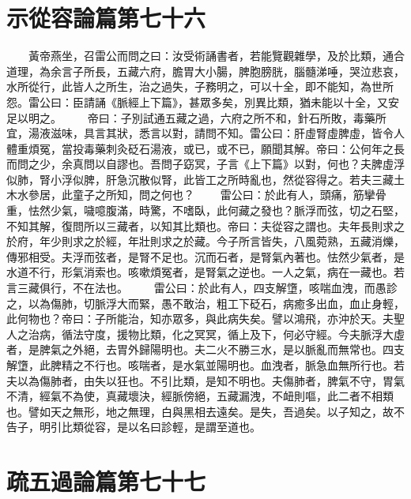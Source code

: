 \section{示從容論篇第七十六}

　　黃帝燕坐，召雷公而問之曰：汝受術誦書者，若能覽觀雜學，及於比類，通合道理，為余言子所長，五藏六府，膽胃大小腸，脾胞膀胱，腦髓涕唾，哭泣悲哀，水所從行，此皆人之所生，治之過失，子務明之，可以十全，即不能知，為世所怨。雷公曰：臣請誦《脈經上下篇》，甚眾多矣，別異比類，猶未能以十全，又安足以明之。
　　帝曰：子別試通五藏之過，六府之所不和，針石所敗，毒藥所宜，湯液滋味，具言其狀，悉言以對，請問不知。雷公曰：肝虛腎虛脾虛，皆令人體重煩冤，當投毒藥刺灸砭石湯液，或已，或不已，願聞其解。帝曰：公何年之長而問之少，余真問以自謬也。吾問子窈冥，子言《上下篇》以對，何也？夫脾虛浮似肺，腎小浮似脾，肝急沉散似腎，此皆工之所時亂也，然從容得之。若夫三藏土木水參居，此童子之所知，問之何也？
　　雷公曰：於此有人，頭痛，筋攣骨重，怯然少氣，噦噫腹滿，時驚，不嗜臥，此何藏之發也？脈浮而弦，切之石堅，不知其解，復問所以三藏者，以知其比類也。帝曰：夫從容之謂也。夫年長則求之於府，年少則求之於經，年壯則求之於藏。今子所言皆失，八風菀熟，五藏消爍，傳邪相受。夫浮而弦者，是腎不足也。沉而石者，是腎氣內著也。怯然少氣者，是水道不行，形氣消索也。咳嗽煩冤者，是腎氣之逆也。一人之氣，病在一藏也。若言三藏俱行，不在法也。
　　雷公曰：於此有人，四支解墯，咳喘血洩，而愚診之，以為傷肺，切脈浮大而緊，愚不敢治，粗工下砭石，病癒多出血，血止身輕，此何物也？帝曰：子所能治，知亦眾多，與此病失矣。譬以鴻飛，亦沖於天。夫聖人之治病，循法守度，援物比類，化之冥冥，循上及下，何必守經。今夫脈浮大虛者，是脾氣之外絕，去胃外歸陽明也。夫二火不勝三水，是以脈亂而無常也。四支解墯，此脾精之不行也。咳喘者，是水氣並陽明也。血洩者，脈急血無所行也。若夫以為傷肺者，由失以狂也。不引比類，是知不明也。夫傷肺者，脾氣不守，胃氣不清，經氣不為使，真藏壞決，經脈傍絕，五藏漏洩，不衄則嘔，此二者不相類也。譬如天之無形，地之無理，白與黑相去遠矣。是失，吾過矣。以子知之，故不告子，明引比類從容，是以名曰診輕，是謂至道也。


\section{疏五過論篇第七十七}

